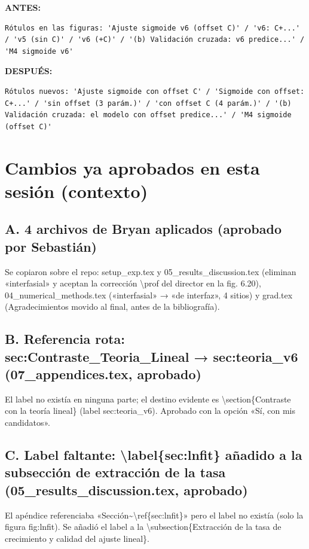 \documentclass[11pt,a4paper]{article}
\begin{document}
\textcolor{antesline}{\textbf{ANTES:}}
\begin{Verbatim}[breaklines=true, breakanywhere=true, fontsize=\small, frame=leftline, rulecolor=\color{antesline}, framerule=1.2pt]
Rótulos en las figuras: 'Ajuste sigmoide v6 (offset C)' / 'v6: C+...' / 'v5 (sin C)' / 'v6 (+C)' / '(b) Validación cruzada: v6 predice...' / 'M4 sigmoide v6'
\end{Verbatim}
\textcolor{despline}{\textbf{DESPUÉS:}}
\begin{Verbatim}[breaklines=true, breakanywhere=true, fontsize=\small, frame=leftline, rulecolor=\color{despline}, framerule=1.2pt]
Rótulos nuevos: 'Ajuste sigmoide con offset C' / 'Sigmoide con offset: C+...' / 'sin offset (3 parám.)' / 'con offset C (4 parám.)' / '(b) Validación cruzada: el modelo con offset predice...' / 'M4 sigmoide (offset C)'
\end{Verbatim}

\section*{Cambios ya aprobados en esta sesión (contexto)}
\subsection*{A. 4 archivos de Bryan aplicados (aprobado por Sebastián)}
Se copiaron sobre el repo: setup\_exp.tex y 05\_results\_discussion.tex (eliminan «interfasial» y aceptan la corrección \textbackslash{}prof del director en la fig. 6.20), 04\_numerical\_methods.tex («interfasial» → «de interfaz», 4 sitios) y grad.tex (Agradecimientos movido al final, antes de la bibliografía).

\subsection*{B. Referencia rota: sec:Contraste\_Teoria\_Lineal → sec:teoria\_v6 (07\_appendices.tex, aprobado)}
El label no existía en ninguna parte; el destino evidente es \textbackslash{}section\{Contraste con la teoría lineal\} (label sec:teoria\_v6). Aprobado con la opción «Sí, con mis candidatos».

\subsection*{C. Label faltante: \textbackslash{}label\{sec:lnfit\} añadido a la subsección de extracción de la tasa (05\_results\_discussion.tex, aprobado)}
El apéndice referenciaba «Sección\textasciitilde{}\textbackslash{}ref\{sec:lnfit\}» pero el label no existía (solo la figura fig:lnfit). Se añadió el label a la \textbackslash{}subsection\{Extracción de la tasa de crecimiento y calidad del ajuste lineal\}.
\end{document}
